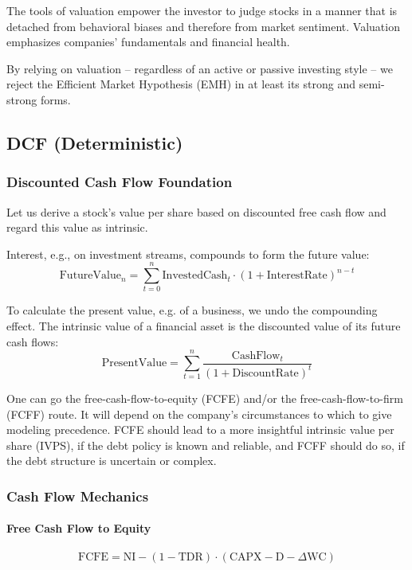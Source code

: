 The tools of valuation empower the investor to judge stocks in a manner that is detached from behavioral biases and therefore from market sentiment. Valuation emphasizes companies' fundamentals and financial health.

By relying on valuation -- regardless of an active or passive investing style -- we reject the Efficient Market Hypothesis (EMH) in at least its strong and semi-strong forms.

\subsection{DCF (Deterministic)}

\subsubsection{Discounted Cash Flow Foundation}

Let us derive a stock's value per share based on discounted free cash flow and regard this value as intrinsic.

Interest, e.g., on investment streams, compounds to form the future value:
\[
\text{FutureValue}_n = \sum_{t=0}^{n} \text{InvestedCash}_t \cdot (1 + \text{InterestRate})^{n - t}
\]

To calculate the present value, e.g. of a business, we undo the compounding effect. The intrinsic value of a financial asset is the discounted value of its future cash flows:
\[
\text{PresentValue} = \sum_{t=1}^{n} \frac{\text{CashFlow}_t}{(1 + \text{DiscountRate})^t}
\]

One can go the free-cash-flow-to-equity (FCFE) and/or the free-cash-flow-to-firm (FCFF) route. It will depend on the company's circumstances to which to give modeling precedence. FCFE should lead to a more insightful intrinsic value per share (IVPS), if the debt policy is known and reliable, and FCFF should do so, if the debt structure is uncertain or complex.

\subsubsection{Cash Flow Mechanics}

\paragraph{Free Cash Flow to Equity}

$$
\text{FCFE} = \text{NI} - (1 - \text{TDR}) \cdot (\text{CAPX} - \text{D} - \Delta \text{WC})
$$

